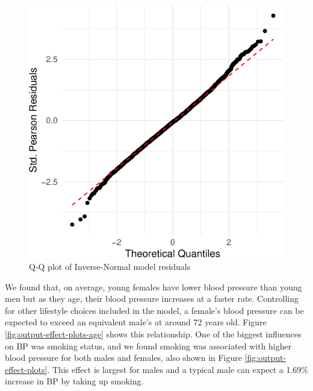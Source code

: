 \documentclass[
  11pt,
  twocolumn]{article}
\begin{document}
\begin{figure}[H]

{\centering \includegraphics{Coursework_files/figure-latex/output-qq-plot-1} 

}

\caption{Q-Q plot of Inverse-Normal model residuals}\label{fig:output-qq-plot}
\end{figure}

We found that, on average, young females have lower blood pressure than
young men but as they age, their blood pressure increases at a faster
rate. Controlling for other lifestyle choices included in the model, a
female's blood pressure can be expected to exceed an equivalent male's
at around 72 years old. Figure \ref{fig:output-effect-plots-age} shows
this relationship. One of the biggest influences on BP was smoking
status, and we found smoking was associated with higher blood pressure
for both males and females, also shown in Figure
\ref{fig:output-effect-plots}. This effect is largest for males and a
typical male can expect a 1.69\% increase in BP by taking up smoking.
\end{document}
